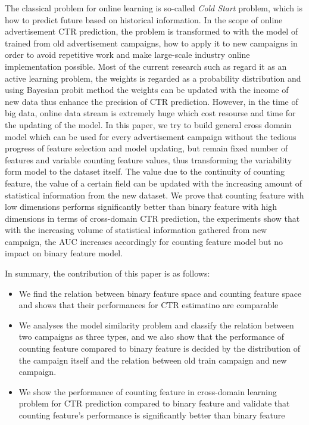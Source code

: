 The classical problem for online learning is so-called \textit{Cold Start} problem, which is how to predict future based on historical information. In the scope of online advertisement CTR prediction, the problem is transformed to with the model of trained from old advertisement campaigns, how to apply it to new campaigns in order to avoid repetitive work and make large-scale industry online implementation possible. Most of the current research such as \cite{mohan2011web} \cite{chu2011unbiased} \cite{he2014practical}\cite{mcmahan2013ad} regard it as an active learning problem, the weights is regarded as a probability distribution and using Bayesian probit method the weights can be updated with the income of new data thus enhance the precision of CTR prediction. However, in the time of big data, online data stream is extremely huge which cost resourse and time for the updating of the model. In this paper, we try to build general cross domain model which can be used for every advertisement campaign without the tedious progress of feature selection and model updating, but remain fixed number of features and variable counting feature values, thus transforming the variability form model to the dataset itself. The value  due to the continuity of counting feature, the value of a certain field can be updated with the increasing amount of statistical information from the new dataset. We prove that counting feature with low dimensions performs significantly better than binary feature with high dimensions in terms of cross-domain CTR prediction, the experiments show that with the increasing volume of statistical information gathered from new campaign, the AUC increases accordingly for counting feature model but no impact on binary feature model. 

In summary, the contribution of this paper is as follows:

\begin{itemize}
\item We find the relation between binary feature space and counting feature space and shows that their performances for CTR estimatino are comparable
\item We analyses the model similarity problem and classify the relation between two campaigns as three types, and we also show that the performance of counting feature compared to binary feature is decided by the distribution of the campaign itself and the relation between old train campaign and new campaign.
\item We show the performance of counting feature in cross-domain learning problem for CTR prediction compared to binary feature and validate that counting feature's performance is significantly better than binary feature
\end{itemize}

